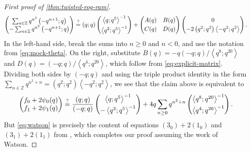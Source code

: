 \documentclass[reqno,11pt]{amsart}
\theoremstyle{definition}
\theoremstyle{remark}
\numberwithin{equation}{section}
\newcommand{\Z}{\mathbb{Z}}
\newcommand{\la}{\left\langle}
\newcommand{\ra}{\right\rangle}
\begin{document}
\begin{proof}[First proof of \cref{thm:twisted-rog-ram}]
\[\begin{pmatrix}
    \sum_{n \in \Z} q^{n^2} \left(-q^{n+1}; q\right)
    \\
    -\sum_{n \in \Z} q^{n^2} \left(-q^{n+1}; q\right)
    \end{pmatrix}
    \stackrel{?}{=}
    (q; q)
    \begin{pmatrix}
    \la q; q^5 \ra^{-1} \vspace{0.1cm} \\ 
    \la q^2; q^5 \ra^{-1}
    \end{pmatrix}
    +
    \begin{pmatrix}
    A(q) & B(q) \vspace{0.1cm}\\
    C(q) & D(q)
    \end{pmatrix}
    \begin{pmatrix}
    0\vspace{0.1cm} \\
    -2\left(q^2; q^2\right)\la -q^2; q^2 \ra
    \end{pmatrix}.
\]
In the left-hand side, break the sums into $n \ge 0$ and $n < 0$, and use the notation from \cref{eq:mock-theta}. On the right, substitute $B(q) = -q\left(-q; q\right)/\la q^8; q^{20}\ra$ and $D(q) = \left(-q; q\right)/\la q^4; q^{20} \ra$, which follow from \cref{eq:explicit-matrix}. Dividing both sides by $(-q; q)$ and using the triple product identity in the form $\sum_{n \in \Z} q^{n^2+n} = \left(q^2; q^2\right) \la -q^2; q^2 \ra$, we see that the claim above is equivalent to
\begin{equation}\label{eq:watson}
    \begin{pmatrix}
    f_0 + 2\psi_0(q)
    \\
    f_1 + 2\psi_1(q)
    \end{pmatrix}
    \stackrel{?}{=}
    \frac{(q; q)}{(-q; q)}
    \begin{pmatrix}
    \la q; q^5 \ra^{-1} \vspace{0.1cm} \\ 
    -\la q^2; q^5 \ra^{-1}
    \end{pmatrix}
    +
    4q \sum_{n \ge 0} q^{n^2+n} 
    \begin{pmatrix}
    \la q^8; q^{20} \ra^{-1}
    \vspace{0.1cm} \\
    \la q^4; q^{20} \ra^{-1}
    \end{pmatrix}.
\end{equation}
But \cref{eq:watson} is precisely the content of equations $(3_0) + 2(1_0)$ and $(3_1) + 2(1_1)$ from \cite{watson1937mock}, which completes our proof assuming the work of Watson.
\end{proof}
\end{document}
